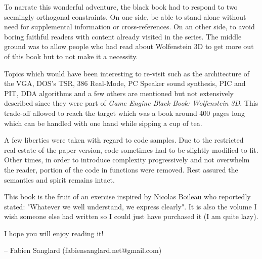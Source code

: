  To narrate this wonderful adventure, the black book had to respond to two seemingly orthogonal constraints. On one side,  be able to stand alone without need for supplemental information or cross-references. On an other side, to avoid boring faithful readers with content already visited in the series. The middle ground was to allow people who had read about Wolfenstein 3D to get more out of this book but to not make it a necessity.\\
 \par
 Topics which would have been interesting to re-visit such as the architecture of the VGA, DOS's TSR, 386 Real-Mode, PC Speaker sound synthesis, PIC and PIT, DDA algorithms and a few others are mentioned but not extensively described since they were part of \textit{Game Engine Black Book: Wolfenstein 3D}. This trade-off allowed to reach the target which was a book around 400 pages long which can be handled with one hand while sipping a cup of tea.\\
\par
A few liberties were taken with regard to code samples. Due to the restricted real-estate of the paper version, code sometimes had to be slightly modified to fit. Other times, in order to introduce complexity progressively and not overwhelm the reader, portion of the code in functions were removed. Rest assured the semantics and spirit remains intact.\\
\par 
This book is the fruit of an exercise inspired by Nicolas Boileau who reportedly stated: "Whatever we well understand, we express clearly". It is also the volume I wish someone else had written so I could just have purchased it (I am quite lazy).\\
\par
I hope you will enjoy reading it!\\
\par
-- Fabien Sanglard (fabiensanglard.net@gmail.com)
